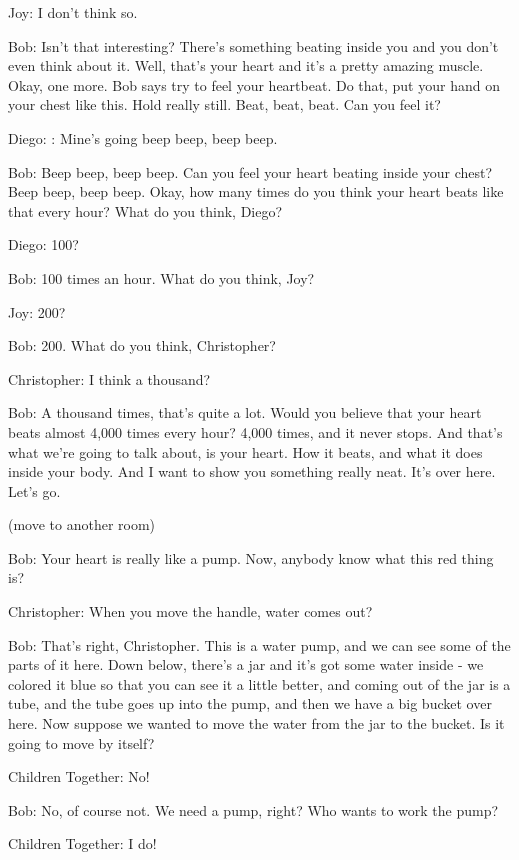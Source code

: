 Joy: I don't think so.

Bob: Isn't that interesting? There's something beating inside you and you don't even think about it. Well, that's your heart and it's a pretty amazing muscle. Okay, one more. Bob says try to feel your heartbeat. Do that, put your hand on your chest like this. Hold really still. Beat, beat, beat. Can you feel it?

Diego: : Mine's going beep beep, beep beep.

Bob: Beep beep, beep beep. Can you feel your heart beating inside your chest? Beep beep, beep beep. Okay, how many times do you think your heart beats like that every hour? What do you think, Diego?

Diego: 100?

Bob: 100 times an hour. What do you think, Joy?

Joy: 200?

Bob: 200. What do you think, Christopher?

Christopher: I think a thousand?

Bob: A thousand times, that's quite a lot. Would you believe that your heart beats almost 4,000 times every hour? 4,000 times, and it never stops. And that's what we're going to talk about, is your heart. How it beats, and what it does inside your body. And I want to show you something really neat. It's over here. Let's go.

(move to another room)

Bob: Your heart is really like a pump. Now, anybody know what this red thing is?

Christopher: When you move the handle, water comes out?

Bob: That's right, Christopher. This is a water pump, and we can see some of the parts of it here. Down below, there's a jar and it's got some water inside - we colored it blue so that you can see it a little better, and coming out of the jar is a tube, and the tube goes up into the pump, and then we have a big bucket over here. Now suppose we wanted to move the water from the jar to the bucket. Is it going to move by itself?

Children Together: No!

Bob: No, of course not. We need a pump, right? Who wants to work the pump?

Children Together: I do!

